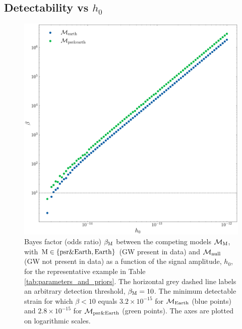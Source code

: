 \documentclass[fleqn,usenatbib,useAMS]{mnras}
\begin{document}
\subsection{Detectability vs $h_0$}\label{sec:psr_v_earth_bayes}
		\begin{figure}
			\includegraphics[width=\columnwidth, height = \columnwidth ]{images/CanonicalBayesPlot2000} 	
			\caption{Bayes factor (odds ratio) $\beta_{\rm M}$ between the competing models $\mathcal{M}_{\rm M}$, with $\rm M \in \left \{ \rm psr \& Earth, Earth \right \}$ (GW present in data) and $\mathcal{M}_{\rm null}$ (GW not present in data) as a function of the signal amplitude, $h_0$, for the representative example in Table \ref{tab:parameters_and_priors}. The horizontal grey dashed line labels an arbitrary detection threshold, $\beta_{\rm M} = 10$. The minimum detectable strain for which $\beta < 10$ equals $3.2 \times 10^{-15}$ for $\mathcal{M}_{\rm Earth}$ (blue points) and $2.8 \times 10^{-15}$ for $\mathcal{M}_{\rm psr \& Earth}$ (green points). The axes are plotted on logarithmic scales.}
			\label{fig:bayes1}
		\end{figure}
	
\end{document}
